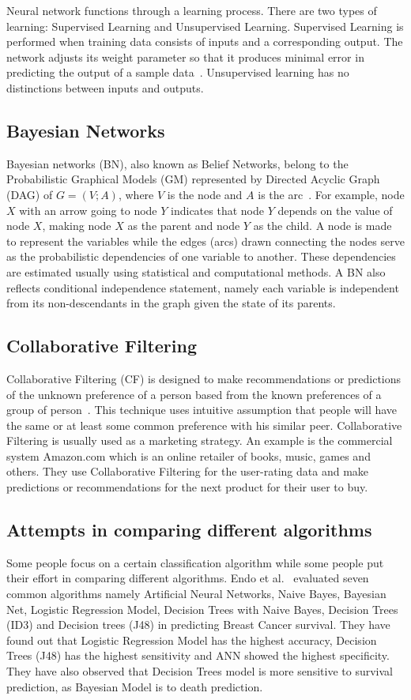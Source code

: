 \documentclass[journal]{./IEEE/IEEEtran}
\begin{document}
	Neural network functions through a learning process. There are two types of learning: Supervised Learning and Unsupervised Learning. Supervised Learning is performed when training data consists of inputs and a corresponding output. The network adjusts its weight parameter so that it produces minimal error in predicting the output of a sample data~\cite{Philip01}. Unsupervised learning has no distinctions between inputs and outputs. 

\subsection{Bayesian Networks}
	Bayesian networks (BN), also known as Belief Networks, belong to the Probabilistic Graphical Models (GM) represented by Directed Acyclic Graph (DAG) of $G = (V;A)$, where $V$ is the node and $A$ is the arc~\cite{Scutari10}. For example, node $X$ with an arrow going to node $Y$ indicates that node $Y$ depends on the value of node $X$, making node $X$ as the parent and node $Y$ as the child. A node is made to represent the variables while the edges (arcs) drawn connecting the nodes serve as the probabilistic dependencies of one variable to another. These dependencies are estimated usually using statistical and computational methods. A BN also reflects conditional independence statement, namely each variable is independent from its non-descendants in the graph given the state of its parents. 

\subsection{Collaborative Filtering}
	Collaborative Filtering (CF) is designed to make recommendations or predictions of the unknown preference of a person based from the known preferences of a group of person~\cite{Su09}. This technique uses intuitive assumption that people will have the same or at least some common preference with his similar peer. Collaborative Filtering is usually used as a marketing strategy. An example is the commercial system Amazon.com which is an online retailer of books, music, games and others. They use Collaborative Filtering for the user-rating data and make predictions or recommendations for the next product for their user to buy. 

\subsection{Attempts in comparing different algorithms}
	Some people focus on a certain classification algorithm while some people put their effort in comparing different algorithms. Endo et al.~\cite{Endo08} evaluated seven common algorithms namely Artificial Neural Networks, Naive Bayes, Bayesian Net, Logistic Regression Model, Decision Trees with Naive Bayes, Decision Trees (ID3) and Decision trees (J48) in predicting Breast Cancer survival. They have found out that Logistic Regression Model has the highest accuracy, Decision Trees (J48) has the highest sensitivity and ANN showed the highest specificity. They have also observed that Decision Trees model is more sensitive to survival prediction, as Bayesian Model is to death prediction.
\end{document}
